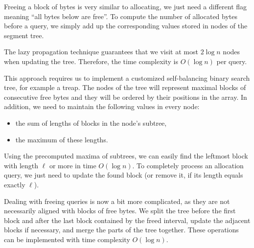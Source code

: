 Freeing a block of bytes is very similar to allocating, we just need a different
flag meaning ``all bytes below are free''. To compute the number of allocated
bytes before a query, we simply add up the corresponding values stored in nodes
of the segment tree.

The lazy propagation technique guarantees that we visit at most $2 \log n$ nodes
when updating the tree. Therefore, the time complexity is $O(\log n)$ per query.



This approach requires us to implement a customized self-balancing binary search
tree, for example a treap. The nodes of the tree will represent maximal blocks
of consecutive free bytes and they will be ordered by their positions in the
array. In addition, we need to maintain the following values in every node:
\begin{itemize}
\item the sum of lengths of blocks in the node's subtree,
\item the maximum of these lengths.
\end{itemize}

\bigskip

Using the precomputed maxima of subtrees, we can easily find the leftmost block
with length $\ell$ or more in time $O(\log n)$. To completely process an
allocation query, we just need to update the found block (or remove it, if its
length equals exactly $\ell$).

Dealing with freeing queries is now a bit more complicated, as they are not
necessarily aligned with blocks of free bytes. We split the tree before the
first block and after the last block contained by the freed interval, update the
adjacent blocks if necessary, and merge the parts of the tree together. These
operations can be implemented with time complexity $O(\log n)$.
